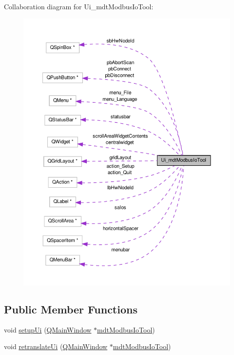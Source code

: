 Collaboration diagram for Ui\-\_\-mdt\-Modbus\-Io\-Tool\-:
\nopagebreak
\begin{figure}[H]
\begin{center}
\leavevmode
\includegraphics[width=350pt]{class_ui__mdt_modbus_io_tool__coll__graph}
\end{center}
\end{figure}
\subsection*{Public Member Functions}
\begin{DoxyCompactItemize}
\item 
void \hyperlink{class_ui__mdt_modbus_io_tool_aeceaeaccbc3c38603c0fc35bd5fb2815}{setup\-Ui} (\hyperlink{class_q_main_window}{Q\-Main\-Window} $\ast$\hyperlink{classmdt_modbus_io_tool}{mdt\-Modbus\-Io\-Tool})
\item 
void \hyperlink{class_ui__mdt_modbus_io_tool_a5344c19fa7f91ed18bd9940dab02746b}{retranslate\-Ui} (\hyperlink{class_q_main_window}{Q\-Main\-Window} $\ast$\hyperlink{classmdt_modbus_io_tool}{mdt\-Modbus\-Io\-Tool})
\end{DoxyCompactItemize}
